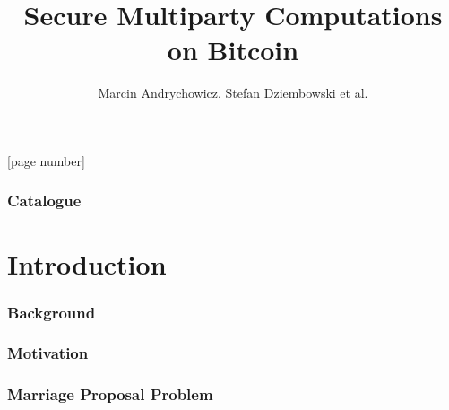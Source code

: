 \documentclass{beamer}
\title{{\Huge Secure Multiparty Computations on Bitcoin}}
\subtitle{}
\author{{\Large Marcin Andrychowicz, Stefan Dziembowski et al.}}%
\date{}
\begin{document}
[page number] 

\begin{frame}
  \maketitle
\end{frame}

      


\begin{frame}
\frametitle{Catalogue} 
\tableofcontents %
\end{frame}



\section{Introduction}

\begin{frame}\frametitle{Background} 

\end{frame}

\begin{frame}\frametitle{Motivation} 

\end{frame}

\begin{frame}\frametitle{Marriage Proposal Problem} 

\end{frame}
\end{document}
